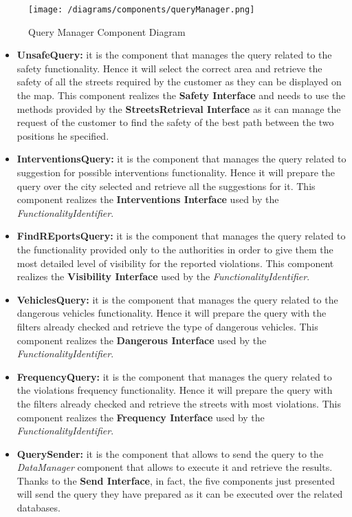 			\begin{figure}[ht]
				\centering
				\texttt{[image: /diagrams/components/queryManager.png]}
				\caption{\label{fig:queryManagerComp} Query Manager Component Diagram}
			\end{figure}
		
			\begin{itemize}
				\item \textbf{UnsafeQuery:} it is the component that manages the query related to the safety functionality. Hence it will select the correct area and retrieve the safety of all the streets required by the customer as they can be displayed on the map. This component realizes the \textbf{Safety Interface} and needs to use the methods provided by the \textbf{StreetsRetrieval Interface} as it can manage the request of the customer to find the safety of the best path between the two positions he specified.
				
				\item \textbf{InterventionsQuery:} it is the component that manages the query related to suggestion for possible interventions functionality. Hence it will prepare the query over the city selected and retrieve all the suggestions for it. This component realizes the \textbf{Interventions Interface} used by the \emph{FunctionalityIdentifier}.
				
				\item \textbf{FindREportsQuery:} it is the component that manages the query related to the functionality provided only to the authorities in order to give them the most detailed level of visibility for the reported violations. This component realizes the \textbf{Visibility Interface} used by the \emph{FunctionalityIdentifier}.
				
				\item \textbf{VehiclesQuery:} it is the component that manages the query related to the dangerous vehicles functionality. Hence it will prepare the query with the filters already checked and retrieve the type of dangerous vehicles. This component realizes the \textbf{Dangerous Interface} used by the \emph{FunctionalityIdentifier}.
				
				\item \textbf{FrequencyQuery:} it is the component that manages the query related to the violations frequency functionality. Hence it will prepare the query with the filters already checked and retrieve the streets with most violations. This component realizes the \textbf{Frequency Interface} used by the \emph{FunctionalityIdentifier}.
				
				\item \textbf{QuerySender:} it is the component that allows to send the query to the \emph{DataManager} component that allows to execute it and retrieve the results. Thanks to the \textbf{Send Interface}, in fact, the five components just presented will send the query they have prepared as it can be executed over the related databases.
			\end{itemize}
		
